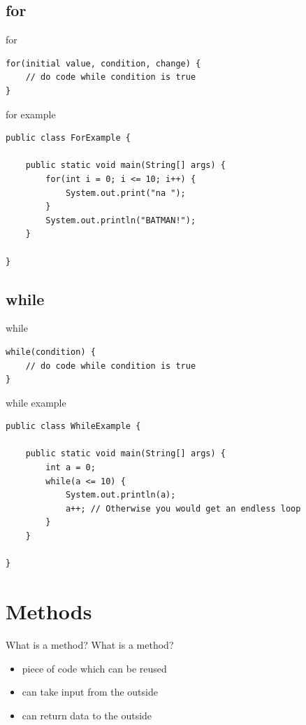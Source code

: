 \subsection{for}
\begin{frame}[fragile]{for}
\begin{lstlisting}
for(initial value, condition, change) {
	// do code while condition is true
}
\end{lstlisting}
\end{frame}

\begin{frame}[fragile]{for example}
\begin{lstlisting}
public class ForExample {

	public static void main(String[] args) {
		for(int i = 0; i <= 10; i++) {
			System.out.print("na ");
		}
		System.out.println("BATMAN!");
	}
    
}
\end{lstlisting}
\end{frame}

\subsection{while}
\begin{frame}[fragile]{while}
\begin{lstlisting}
while(condition) {
	// do code while condition is true
}
\end{lstlisting}
\end{frame}

\begin{frame}[fragile]{while example}
\begin{lstlisting}
public class WhileExample {

	public static void main(String[] args) {
		int a = 0;
		while(a <= 10) {
			System.out.println(a);
            a++; // Otherwise you would get an endless loop
		}
	}
    
}
\end{lstlisting}
\end{frame}

\section{Methods}
\begin{frame}{What is a method?}
	What is a method?
	\begin{itemize}
		\item<1-> piece of code which can be reused
		\item<2-> can take input from the outside
		\item<3-> can return data to the outside
	\end{itemize}
\end{frame}

